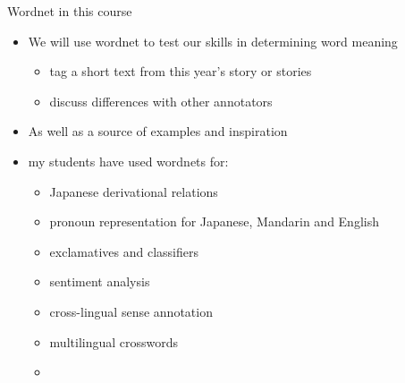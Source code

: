 \documentclass{beamer}
\begin{document}
\begin{frame}{Wordnet in this course}

\begin{itemize}
\item We will use wordnet to test our skills in determining word meaning
  \begin{itemize}
  \item tag a short text from this year's story or stories
  \item discuss differences with other annotators
 \end{itemize}
\item As well as a source of examples and inspiration
\item  my students have used wordnets for:
  \begin{itemize}
  \item  Japanese derivational
relations \citep{Bond:Wei:2019}
\item  pronoun representation for Japanese, Mandarin and English
  \citep{Seah:Bond:2014}
\item exclamatives and classifiers
\citep{Mok:Gao:Bond:2012,daCosta:Bond:2016}
\item  sentiment analysis
  \citep{Le:Moeljadi:Miura:Ohkuma:2016,Bond:Janz:Piasecki:2019}
\item cross-lingual sense annotation \citep{Bonansinga:Bond:2016}
\item multilingual crosswords \citep{Tan:2012}
\item [\ldots]
\end{itemize}
\end{itemize}
\end{frame}



\end{document}
